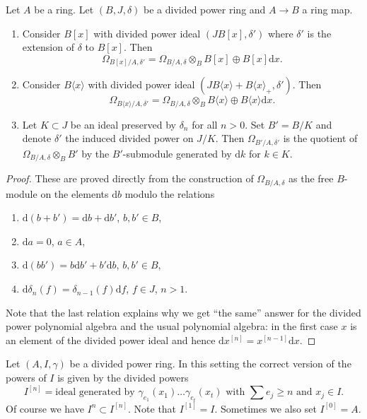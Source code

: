 \begin{lemma}
\label{lemma-omega}
Let $A$ be a ring. Let $(B, J, \delta)$ be a divided power ring and
$A \to B$ a ring map. 
\begin{enumerate}
\item Consider $B[x]$ with divided power ideal $(JB[x], \delta')$
where $\delta'$ is the extension of $\delta$ to $B[x]$. Then
$$
\Omega_{B[x]/A, \delta'} =
\Omega_{B/A, \delta} \otimes_B B[x] \oplus B[x]\text{d}x.
$$
\item Consider $B\langle x \rangle$ with divided power ideal
$(JB\langle x \rangle + B\langle x \rangle_{+}, \delta')$. Then
$$
\Omega_{B\langle x\rangle/A, \delta'} =
\Omega_{B/A, \delta} \otimes_B B\langle x \rangle \oplus
B\langle x\rangle \text{d}x.
$$
\item Let $K \subset J$ be an ideal preserved by $\delta_n$ for
all $n > 0$. Set $B' = B/K$ and denote $\delta'$ the induced
divided power on $J/K$. Then $\Omega_{B'/A, \delta'}$ is the quotient
of $\Omega_{B/A, \delta} \otimes_B B'$ by the $B'$-submodule generated
by $\text{d}k$ for $k \in K$.
\end{enumerate}
\end{lemma}

\begin{proof}
These are proved directly from the construction of $\Omega_{B/A, \delta}$
as the free $B$-module on the elements $\text{d}b$ modulo the relations
\begin{enumerate}
\item $\text{d}(b + b') = \text{d}b + \text{d}b'$, $b, b' \in B$,
\item $\text{d}a = 0$, $a \in A$,
\item $\text{d}(bb') = b \text{d}b' + b' \text{d}b$, $b, b' \in B$,
\item $\text{d}\delta_n(f) = \delta_{n - 1}(f)\text{d}f$, $f \in J$, $n > 1$.
\end{enumerate}
Note that the last relation explains why we get ``the same'' answer for
the divided power polynomial algebra and the usual polynomial algebra:
in the first case $x$ is an element of the divided power ideal and hence
$\text{d}x^{[n]} = x^{[n - 1]}\text{d}x$.
\end{proof}

\noindent
Let $(A, I, \gamma)$ be a divided power ring. In this setting the
correct version of the powers of $I$ is given by the divided powers
$$
I^{[n]} = \text{ideal generated by }
\gamma_{e_1}(x_1) \ldots \gamma_{e_t}(x_t)
\text{ with }\sum e_j \geq n\text{ and }x_j \in I.
$$
Of course we have $I^n \subset I^{[n]}$. Note that $I^{[1]} = I$.
Sometimes we also set $I^{[0]} = A$.

